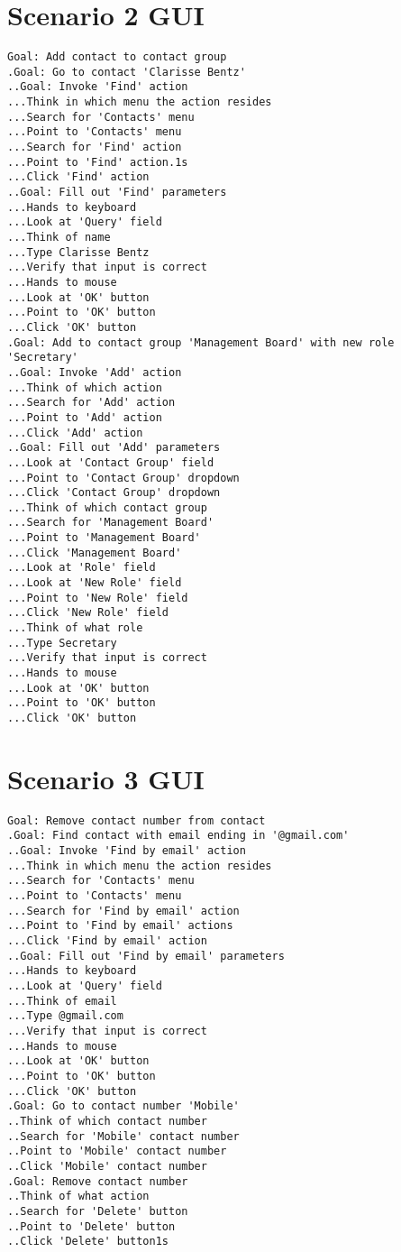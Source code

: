\section{Scenario 2 GUI}
\label{section:scenario2gui}
\begin{verbatim}
Goal: Add contact to contact group
.Goal: Go to contact 'Clarisse Bentz'
..Goal: Invoke 'Find' action
...Think in which menu the action resides
...Search for 'Contacts' menu
...Point to 'Contacts' menu
...Search for 'Find' action
...Point to 'Find' action.1s
...Click 'Find' action
..Goal: Fill out 'Find' parameters
...Hands to keyboard
...Look at 'Query' field
...Think of name
...Type Clarisse Bentz
...Verify that input is correct
...Hands to mouse
...Look at 'OK' button
...Point to 'OK' button
...Click 'OK' button
.Goal: Add to contact group 'Management Board' with new role 'Secretary'
..Goal: Invoke 'Add' action
...Think of which action
...Search for 'Add' action
...Point to 'Add' action
...Click 'Add' action
..Goal: Fill out 'Add' parameters
...Look at 'Contact Group' field
...Point to 'Contact Group' dropdown
...Click 'Contact Group' dropdown
...Think of which contact group
...Search for 'Management Board'
...Point to 'Management Board'
...Click 'Management Board'
...Look at 'Role' field
...Look at 'New Role' field
...Point to 'New Role' field
...Click 'New Role' field
...Think of what role
...Type Secretary
...Verify that input is correct
...Hands to mouse
...Look at 'OK' button
...Point to 'OK' button
...Click 'OK' button
\end{verbatim}

\section{Scenario 3 GUI}
\label{section:scenario3gui}
\begin{verbatim}
Goal: Remove contact number from contact
.Goal: Find contact with email ending in '@gmail.com'
..Goal: Invoke 'Find by email' action
...Think in which menu the action resides
...Search for 'Contacts' menu
...Point to 'Contacts' menu
...Search for 'Find by email' action
...Point to 'Find by email' actions
...Click 'Find by email' action
..Goal: Fill out 'Find by email' parameters
...Hands to keyboard
...Look at 'Query' field 
...Think of email
...Type @gmail.com
...Verify that input is correct
...Hands to mouse
...Look at 'OK' button
...Point to 'OK' button
...Click 'OK' button
.Goal: Go to contact number 'Mobile'
..Think of which contact number
..Search for 'Mobile' contact number
..Point to 'Mobile' contact number
..Click 'Mobile' contact number
.Goal: Remove contact number
..Think of what action
..Search for 'Delete' button
..Point to 'Delete' button
..Click 'Delete' button1s
\end{verbatim}

